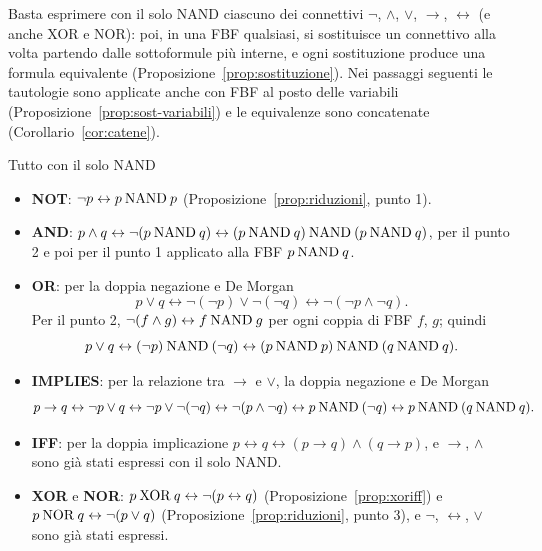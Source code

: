 \begin{concetto}
\begin{dimostrazione}
    Basta esprimere con il solo NAND ciascuno dei connettivi $\neg$, $\wedge$, $\vee$, $\rightarrow$, $\leftrightarrow$
    (e anche XOR e NOR): poi, in una FBF qualsiasi, si sostituisce un connettivo alla volta partendo dalle sottoformule
    più interne, e ogni sostituzione produce una formula equivalente (Proposizione~\ref{prop:sostituzione}).
    Nei passaggi seguenti le tautologie sono applicate anche con FBF al posto delle variabili (Proposizione~\ref{prop:sost-variabili})
    e le equivalenze sono concatenate (Corollario~\ref{cor:catene}).
    \begin{caso}{Tutto con il solo NAND}
    \begin{itemize}
        \item \textbf{NOT}: $\neg p \leftrightarrow p \mathbin{\mathrm{NAND}} p$ (Proposizione~\ref{prop:riduzioni}, punto 1).
        \item \textbf{AND}: $p \wedge q \leftrightarrow \neg(p \mathbin{\mathrm{NAND}} q) \leftrightarrow (p \mathbin{\mathrm{NAND}} q) \mathbin{\mathrm{NAND}} (p \mathbin{\mathrm{NAND}} q)$,
              per il punto 2 e poi per il punto 1 applicato alla FBF $p \mathbin{\mathrm{NAND}} q$.
        \item \textbf{OR}: per la doppia negazione e De Morgan
              \[ p \vee q \leftrightarrow \neg(\neg p) \vee \neg(\neg q) \leftrightarrow \neg(\neg p \wedge \neg q). \]
              Per il punto 2, $\neg(f \wedge g) \leftrightarrow f \mathbin{\mathrm{NAND}} g$ per ogni coppia di FBF $f$, $g$; quindi
              \[ p \vee q \leftrightarrow (\neg p) \mathbin{\mathrm{NAND}} (\neg q) \leftrightarrow (p \mathbin{\mathrm{NAND}} p) \mathbin{\mathrm{NAND}} (q \mathbin{\mathrm{NAND}} q). \]
        \item \textbf{IMPLIES}: per la relazione tra $\rightarrow$ e $\vee$, la doppia negazione e De Morgan
              \[ p \rightarrow q \leftrightarrow \neg p \vee q \leftrightarrow \neg p \vee \neg(\neg q) \leftrightarrow \neg(p \wedge \neg q)
                 \leftrightarrow p \mathbin{\mathrm{NAND}} (\neg q) \leftrightarrow p \mathbin{\mathrm{NAND}} (q \mathbin{\mathrm{NAND}} q). \]
        \item \textbf{IFF}: per la doppia implicazione $p \leftrightarrow q \leftrightarrow (p \rightarrow q) \wedge (q \rightarrow p)$,
              e $\rightarrow$, $\wedge$ sono già stati espressi con il solo NAND.
        \item \textbf{XOR} e \textbf{NOR}: $p \mathbin{\mathrm{XOR}} q \leftrightarrow \neg(p \leftrightarrow q)$ (Proposizione~\ref{prop:xoriff}) e
              $p \mathbin{\mathrm{NOR}} q \leftrightarrow \neg(p \vee q)$ (Proposizione~\ref{prop:riduzioni}, punto 3), e $\neg$, $\leftrightarrow$, $\vee$ sono già stati espressi.
    \end{itemize}

\end{caso}
\end{dimostrazione}
\end{concetto}
